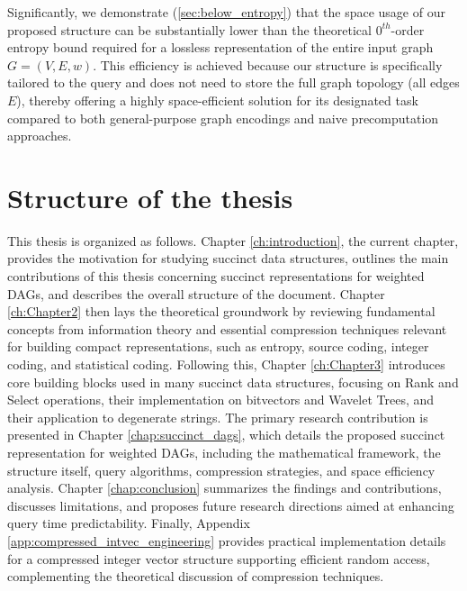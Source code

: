 Significantly, we demonstrate (\autoref{sec:below_entropy}) that the space usage of our proposed structure can be substantially lower than the theoretical $0^{th}$-order entropy bound required for a lossless representation of the entire input graph $G=(V, E, w)$. This efficiency is achieved because our structure is specifically tailored to the \Rank query and does not need to store the full graph topology (all edges $E$), thereby offering a highly space-efficient solution for its designated task compared to both general-purpose graph encodings and naive precomputation approaches.

\section{Structure of the thesis}
\label{sec:structure}

This thesis is organized as follows. Chapter \ref{ch:introduction}, the current chapter, provides the motivation for studying succinct data structures, outlines the main contributions of this thesis concerning succinct representations for weighted DAGs, and describes the overall structure of the document. Chapter \ref{ch:Chapter2} then lays the theoretical groundwork by reviewing fundamental concepts from information theory and essential compression techniques relevant for building compact representations, such as entropy, source coding, integer coding, and statistical coding. Following this, Chapter \ref{ch:Chapter3} introduces core building blocks used in many succinct data structures, focusing on Rank and Select operations, their implementation on bitvectors and Wavelet Trees, and their application to degenerate strings. The primary research contribution is presented in Chapter \ref{chap:succinct_dags}, which details the proposed succinct representation for weighted DAGs, including the mathematical framework, the structure itself, query algorithms, compression strategies, and space efficiency analysis. Chapter \ref{chap:conclusion} summarizes the findings and contributions, discusses limitations, and proposes future research directions aimed at enhancing query time predictability. Finally, Appendix \ref{app:compressed_intvec_engineering} provides practical implementation details for a compressed integer vector structure supporting efficient random access, complementing the theoretical discussion of compression techniques.
